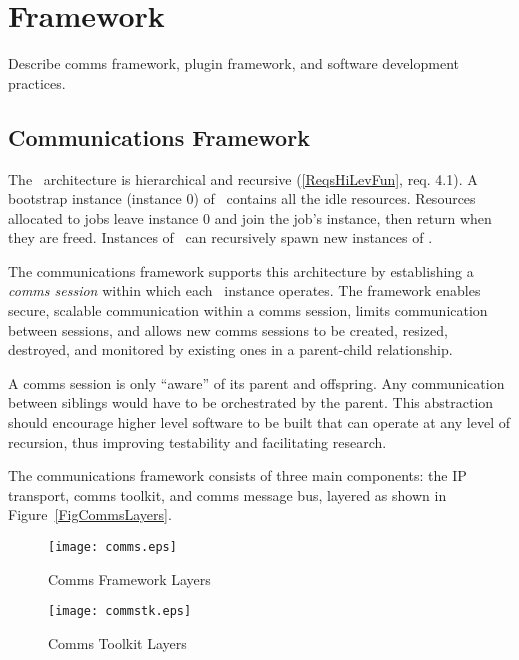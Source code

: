 \section{Framework}

Describe comms framework, plugin framework, and software
development practices.

\subsection{Communications Framework}

The \ngrm\ architecture is hierarchical and recursive
(\ref{ReqsHiLevFun}, req. 4.1).
A bootstrap instance (instance 0) of \ngrm\ contains all the
idle resources.  Resources allocated to jobs leave instance 0
and join the job's instance, then return when they are freed.
Instances of \ngrm\ can recursively spawn new instances of \ngrm.

The communications framework supports this architecture by
establishing a {\em comms session} within which each \ngrm\ instance
operates.  The framework enables secure, scalable communication
within a comms session, limits communication between sessions,
and allows new comms sessions to be created, resized, destroyed,
and monitored by existing ones in a parent-child relationship.

A comms session is only ``aware'' of its parent and offspring.
Any communication between siblings would have to be orchestrated by
the parent.  This abstraction should encourage higher level software
to be built that can operate at any level of recursion, thus improving
testability and facilitating research.

The communications framework consists of three main components:
the IP transport, comms toolkit, and comms message bus, layered
as shown in Figure~\ref{FigCommsLayers}.

\begin{figure}
\begin{minipage}[b]{0.45\linewidth}
\centering
\texttt{[image: comms.eps]}
\caption{Comms Framework Layers}
\label{FigCommsLayers}
\end{minipage}
\hspace{0.5cm}
\begin{minipage}[b]{0.45\linewidth}
\centering
\texttt{[image: commstk.eps]}
\caption{Comms Toolkit Layers}
\label{FigCommsTK}
\end{minipage}
\end{figure}

